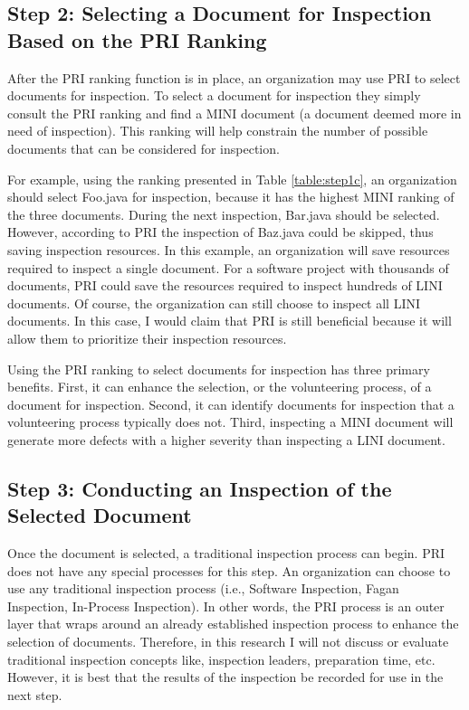 \subsection{Step 2: Selecting a Document for Inspection Based on the PRI
  Ranking} After the PRI ranking function is in place, an organization may
use PRI to select documents for inspection. To select a document for
inspection they simply consult the PRI ranking and find a MINI document (a
document deemed more in need of inspection). This ranking will help
constrain the number of possible documents that can be considered for
inspection.

For example, using the ranking presented in Table \ref{table:step1c}, an
organization should select Foo.java for inspection, because it has the
highest MINI ranking of the three documents. During the next inspection,
Bar.java should be selected. However, according to PRI the inspection of
Baz.java could be skipped, thus saving inspection resources. In this
example, an organization will save resources required to inspect a single
document. For a software project with thousands of documents, PRI could
save the resources required to inspect hundreds of LINI documents. Of
course, the organization can still choose to inspect all LINI documents. In
this case, I would claim that PRI is still beneficial because it will allow
them to prioritize their inspection resources.

Using the PRI ranking to select documents for inspection has three primary
benefits. First, it can enhance the selection, or the volunteering process,
of a document for inspection. Second, it can identify documents for
inspection that a volunteering process typically does not. Third,
inspecting a MINI document will generate more defects with a higher
severity than inspecting a LINI document.


\subsection{Step 3: Conducting an Inspection of the Selected Document}
Once the document is selected, a traditional inspection process can begin.
PRI does not have any special processes for this step. An organization can
choose to use any traditional inspection process (i.e., Software
Inspection, Fagan Inspection, In-Process Inspection). In other words, the
PRI process is an outer layer that wraps around an already established
inspection process to enhance the selection of documents.  Therefore, in
this research I will not discuss or evaluate traditional inspection
concepts like, inspection leaders, preparation time, etc. However, it is
best that the results of the inspection be recorded for use in the next
step.

